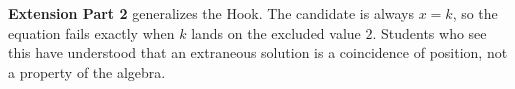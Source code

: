 \documentclass[10pt]{article}
\begin{document}
\begin{teachernote}
\vspace{3pt}
\textbf{Extension Part 2} generalizes the Hook. The candidate is always $x=k$, so the equation fails
exactly when $k$ lands on the excluded value $2$. Students who see this have understood that an
extraneous solution is a coincidence of position, not a property of the algebra.
\end{teachernote}
\end{document}
